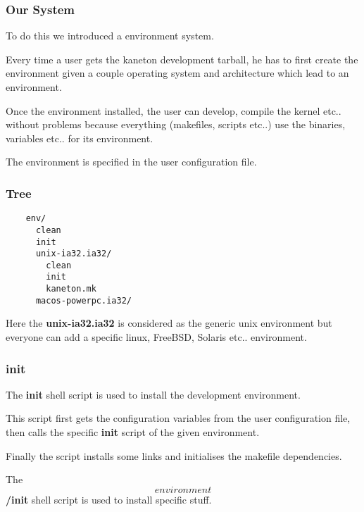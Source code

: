 \documentclass[8pt]{beamer}
\newcommand{\nl}[0]{\vspace{0.4cm}}
\begin{document}

\begin{frame}
  \frametitle{Our System}

  To do this we introduced a environment system.

  \nl

  Every time a user gets the kaneton development tarball, he has to first
  create the environment given a couple operating system and architecture
  which lead to an environment.

  \nl

  Once the environment installed, the user can develop, compile the kernel
  etc.. without problems because everything (makefiles, scripts etc..) use
  the binaries, variables etc.. for its environment.

  \nl

  The environment is specified in the user configuration file.
\end{frame}


\begin{frame}[containsverbatim]
  \frametitle{Tree}

  \begin{verbatim}
    env/
      clean
      init
      unix-ia32.ia32/
        clean
        init
        kaneton.mk
      macos-powerpc.ia32/
  \end{verbatim}

  \nl

  Here the \textbf{unix-ia32.ia32} is considered as the generic unix
  environment but everyone can add a specific linux, FreeBSD, Solaris etc..
  environment.
\end{frame}


\begin{frame}
  \frametitle{init}

  The \textbf{init} shell script is used to install the development
  environment.

  \nl

  This script first gets the configuration variables from the user
  configuration file, then calls the specific \textbf{init} script
  of the given environment.

  \nl

  Finally the script installs some links and initialises the makefile
  dependencies.

  \nl

  The \textbf{\[environment\]/init} shell script is used to install
  specific stuff.
\end{frame}
\end{document}
